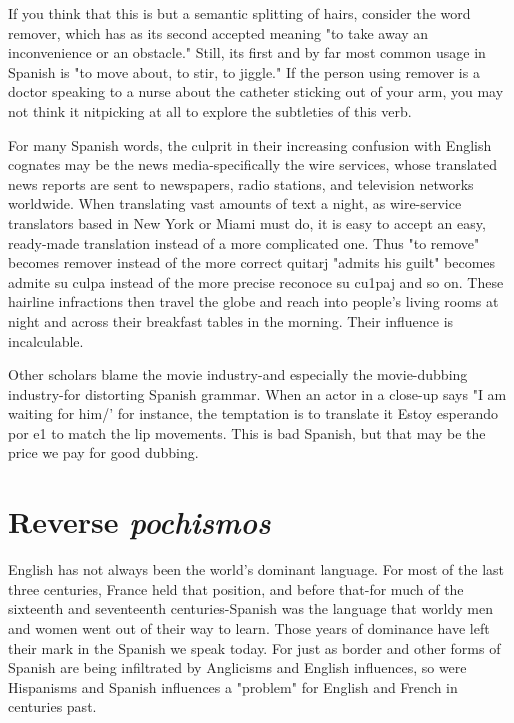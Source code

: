 \documentclass[14pt,a4paper,oneside]{memoir}
\begin{document}
{{{{If you think that this is but a semantic splitting of hairs, consider the word remover, which has as its second accepted meaning "to
take away an inconvenience or an obstacle." Still, its first and by far
most common usage in Spanish is "to move about, to stir, to jiggle."
If the person using remover is a doctor speaking to a nurse about the
catheter sticking out of your arm, you may not think it nitpicking at
all to explore the subtleties of this verb.

For many Spanish words, the culprit in their increasing confusion with English cognates may be the news media-specifically the
wire services, whose translated news reports are sent to newspapers,
radio stations, and television networks worldwide. When translating
vast amounts of text a night, as wire-service translators based in New
York or Miami must do, it is easy to accept an easy, ready-made translation instead of a more complicated one. Thus "to remove" becomes
remover instead of the more correct quitarj "admits his guilt" becomes admite su culpa instead of the more precise reconoce su cu1paj
and so on. These hairline infractions then travel the globe and reach
into people's living rooms at night and across their breakfast tables in
the morning. Their influence is incalculable.

Other scholars blame the movie industry-and especially the
movie-dubbing industry-for distorting Spanish grammar. When an
actor in a close-up says "I am waiting for him/' for instance, the temptation is to translate it Estoy esperando por e1 to match the lip movements. This is bad Spanish, but that may be the price we pay for good
dubbing.

\section{Reverse \emph{pochismos}}

English has not always been the world's dominant language.
For most of the last three centuries, France held that position, and before that-for much of the sixteenth and seventeenth centuries-Spanish was the language that worldy men and women went out of their
way to learn. Those years of dominance have left their mark in the
Spanish we speak today. For just as border and other forms of Spanish
are being infiltrated by Anglicisms and English influences, so were Hispanisms and Spanish influences a "problem" for English and French in
centuries past.

}}}}
\end{document}
